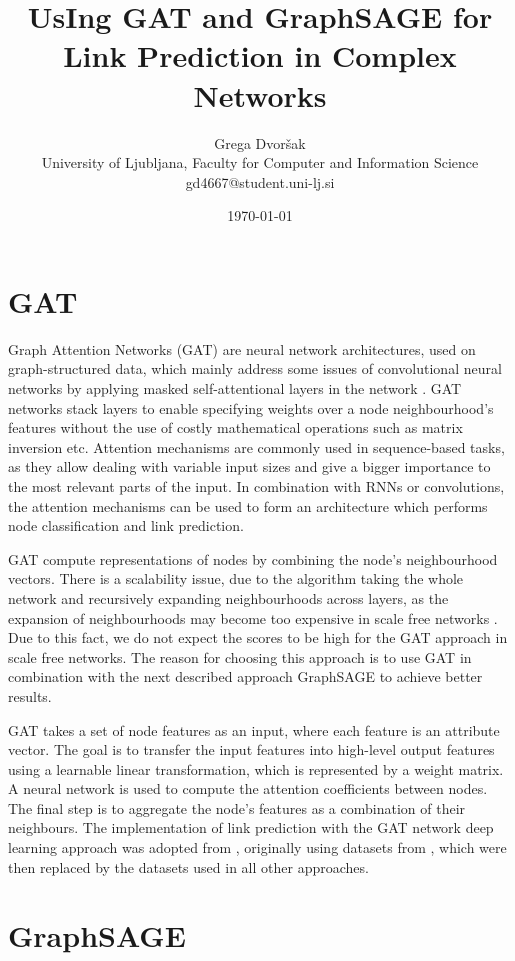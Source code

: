 \documentclass[11pt,journal,compsoc]{article}
\title{\LARGE UsIng GAT and GraphSAGE for Link Prediction in Complex Networks}
\author{\normalsize Grega Dvor\v{s}ak\\
University of Ljubljana, Faculty for Computer and Information Science\\ \medskip 
gd4667@student.uni-lj.si }
\date{\today}
\begin{document}
\maketitle

\section{GAT}

Graph Attention Networks (GAT) are neural network architectures, used on graph-structured data, which mainly address some issues of convolutional neural networks by applying masked self-attentional layers in the network \cite{velikovi2017graph}. GAT networks stack layers to enable specifying weights over a node neighbourhood's features without the use of costly mathematical operations such as matrix inversion etc. Attention mechanisms are commonly used in sequence-based tasks, as they allow dealing with variable input sizes and give a bigger importance to the most relevant parts of the input. In combination with RNNs or convolutions, the attention mechanisms can be used to form an architecture which performs node classification and link prediction.

GAT compute representations of nodes by combining the node's neighbourhood vectors. There is a scalability issue, due to the algorithm taking the whole network and recursively expanding neighbourhoods across layers, as the expansion of neighbourhoods may become too expensive in scale free networks \cite{gu2019link}. Due to this fact, we do not expect the scores to be high for the GAT approach in scale free networks. The reason for choosing this approach is to use GAT in combination with the next described approach GraphSAGE to achieve better results.

GAT takes a set of node features as an input, where each feature is an attribute vector. The goal is to transfer the input features into high-level output features using a learnable linear transformation, which is represented by a weight matrix. A neural network is used to compute the attention coefficients between nodes. The final step is to aggregate the node's features as a combination of their neighbours. The implementation of link prediction with the GAT network deep learning approach was adopted from \cite{gagflp}, originally using datasets from \cite{nr}, which were then replaced by the datasets used in all other approaches.

\section{GraphSAGE}
\end{document}
